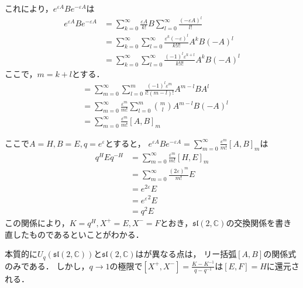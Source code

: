 \documentclass[10pt,dvipdfm]{beamer}
\newcommand{\CC}{\mathbb{C}}
\begin{document}
  \begin{frame}
    これにより，$e^{\varepsilon A}Be^{-\varepsilon A}$は
    \begin{align*}
      e^{\varepsilon A}Be^{-\varepsilon A} &= \sum_{k=0}^{\infty}\frac{\varepsilon A}{k!} B \sum_{l=0}^{\infty}\frac{(-\varepsilon A)^l}{l!} \\
      &= \sum_{k=0}^{\infty}\sum_{l=0}^{\infty}\frac{\varepsilon^k(-\varepsilon)^l}{k!l!}A^kB(-A)^l\\
      &= \sum_{k=0}^{\infty}\sum_{l=0}^{\infty}\frac{(-1)^l\varepsilon^{k+l}}{k!l!}A^kB(-A)^l
    \end{align*}
    ここで，$m=k+l$とする．
    \begin{align*}
      &= \sum_{m=0}^{\infty}\sum_{l=0}^{m}\frac{(-1)^l\varepsilon^{m}}{l!(m-l)!}A^{m-l}BA^l \\
      &= \sum_{m=0}^{\infty}\frac{\varepsilon^{m}}{m!}\sum_{l=0}^{m}\binom{m}{l}A^{m-l}B(-A)^l \\
      &= \sum_{m=0}^{\infty}\frac{\varepsilon^{m}}{m!}[A,B]_m
    \end{align*}
  \end{frame}
  \begin{frame}
    ここで$A=H,B=E,q=e^{\varepsilon}$とすると，
    $e^{\varepsilon A}Be^{-\varepsilon A}=\sum_{m=0}^{\infty}\frac{\varepsilon^{m}}{m!}[A,B]_m$は
    \begin{align*}
      q^H E q^{-H} &= \sum_{m=0}^{\infty}\frac{\varepsilon^{m}}{m!}[H,E]_m\\
      &= \sum_{m=0}^{\infty}\frac{(2\varepsilon)^{m}}{m!}E\\
      &= e^{2\varepsilon}E\\
      &= {e^{\varepsilon}}^2 E\\
      &= q^2 E
    \end{align*}
    この関係により，$K = q^H,X^+=E,X^-=F$とおき，$\mathfrak{sl}(2,\CC)$の交換関係を書き直したものであるといことがわかる．

    本質的に$U_q(\mathfrak{sl}(2,\CC))$と$\mathfrak{sl}(2,\CC)$はが異なる点は，
    リー括弧$[A,B]$の関係式のみである．
    しかし，$q\to1$の極限で$[X^+,X^-]=\frac{K-K^{-1}}{q-q^{-1}}$は$[E,F]=H$に還元される．
  \end{frame}
\end{document}
